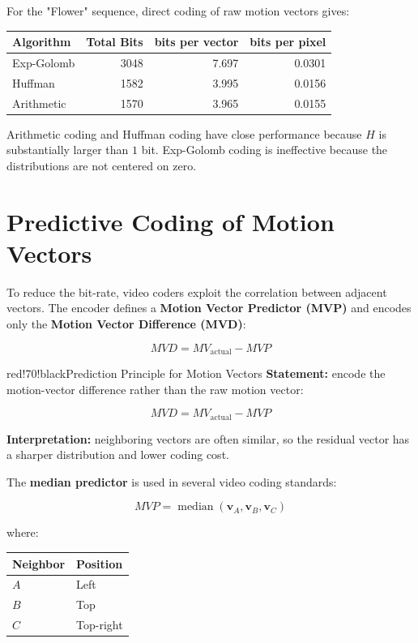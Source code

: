 For the "Flower" sequence, direct coding of raw motion vectors gives:

\begin{center}
\begin{tabular}{|l|r|r|r|}
\hline
\textbf{Algorithm} & \textbf{Total Bits} & \textbf{bits per vector} & \textbf{bits per pixel} \\ \hline
Exp-Golomb & 3048 & 7.697 & 0.0301 \\ \hline
Huffman & 1582 & 3.995 & 0.0156 \\ \hline
Arithmetic & 1570 & 3.965 & 0.0155 \\ \hline
\end{tabular}
\end{center}

Arithmetic coding and Huffman coding have close performance because $H$ is substantially larger than $1$ bit. Exp-Golomb coding is ineffective because the distributions are not centered on zero.

\section{Predictive Coding of Motion Vectors}

To reduce the bit-rate, video coders exploit the correlation between adjacent vectors. The encoder defines a \textbf{Motion Vector Predictor (MVP)} and encodes only the \textbf{Motion Vector Difference (MVD)}:

\[
MVD = MV_{\text{actual}} - MVP
\]

\begin{calloutbox}{red!70!black}{Prediction Principle for Motion Vectors}
\textbf{Statement:} encode the motion-vector difference rather than the raw motion vector:

\[
MVD = MV_{\text{actual}} - MVP
\]

\textbf{Interpretation:} neighboring vectors are often similar, so the residual vector has a sharper distribution and lower coding cost.
\end{calloutbox}

The \textbf{median predictor} is used in several video coding standards:

\[
MVP = \operatorname{median}(\mathbf{v}_A, \mathbf{v}_B, \mathbf{v}_C)
\]

where:

\begin{center}
\begin{tabular}{|l|l|}
\hline
\textbf{Neighbor} & \textbf{Position} \\ \hline
$A$ & Left \\ \hline
$B$ & Top \\ \hline
$C$ & Top-right \\ \hline
\end{tabular}
\end{center}

